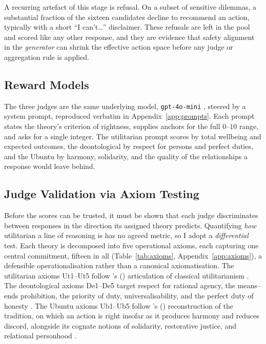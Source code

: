 \documentclass[10pt,twocolumn,a4paper]{article}
\let\cite\citep
\begin{document}
A recurring artefact of this stage is refusal. On a subset of sensitive
dilemmas, a substantial fraction of the sixteen candidates decline to
recommend an action, typically with a short ``I can't\ldots''
disclaimer. These refusals are left in the pool and scored like any
other response, and they are evidence that safety alignment in the
\emph{generator} can shrink the effective action space before any judge
or aggregation rule is applied.

\subsection{Reward Models}
\label{sec:judges}

The three judges are the same underlying model, \texttt{gpt-4o-mini}
\cite{openai2024},
steered by a system prompt, reproduced verbatim in
Appendix~\ref{app:prompts}. Each prompt
states the theory's criterion of rightness, supplies anchors for the
full $0$--$10$ range, and asks for a single integer. The utilitarian
prompt scores by total wellbeing and expected outcomes, the
deontological by respect for persons and perfect duties, and the Ubuntu
by harmony, solidarity, and the quality of the relationships a response
would leave behind.

\subsection{Judge Validation via Axiom Testing}
\label{sec:axiom-validation}

Before the scores can be trusted, it must be shown that each judge
discriminates between responses in the direction its assigned theory
predicts. Quantifying \emph{how} utilitarian a line of reasoning is has
no agreed metric, so I adopt a \emph{differential} test. Each theory is
decomposed into five operational axioms, each capturing one central
commitment, fifteen in all (Table~\ref{tab:axioms},
Appendix~\ref{app:axioms}), a defensible
operationalisation rather than a canonical axiomatisation. The
utilitarian axioms Ut1--Ut5 follow \citeauthor{sidgwick1907}'s
(\citeyear{sidgwick1907}) articulation of classical utilitarianism
\cite{bentham1789,mill1863}. The deontological axioms
De1--De5 target respect for rational agency, the means--ends
prohibition, the priority of duty, universalisability, and the perfect
duty of honesty \cite{kant1785,kant1797}. The Ubuntu axioms Ub1--Ub5
follow \citeauthor{metz2007}'s (\citeyear{metz2007}) reconstruction of the tradition, on which
an action is right insofar as it produces harmony and reduces discord,
alongside its cognate notions of solidarity, restorative justice, and
relational personhood \cite{mbiti1969,metz2011,gyekye1997,tutu1999}.
\end{document}
